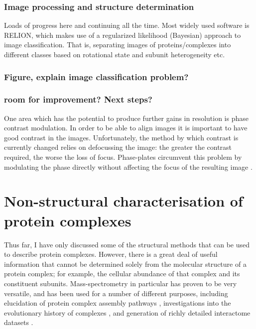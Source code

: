 \documentclass[a4paper,11pt,twoside,openright]{scrbook}
\let\cite\supercite
\begin{document}
\subsubsection{Image processing and structure determination}
Loads of progress here and continuing all the time. Most widely used software is RELION, which makes use of a regularized likelihood (Bayesian) approach to image classification. That is, separating images of proteins/complexes into different classes based on rotational state and subunit heterogeneity etc.

\subsubsection{Figure, explain image classification problem?}

\subsubsection{room for improvement? Next steps?}
One area which has the potential to produce further gains in resolution is phase contrast modulation. In order to be able to align images it is important to have good contrast in the images. Unfortunately, the method by which contrast is currently changed relies on defocussing the image: the greater the contrast required, the worse the loss of focus. Phase-plates circumvent this problem by modulating the phase directly without affecting the focus of the resulting image \cite{Danev2016}.

\section{Non-structural characterisation of protein complexes}
Thus far, I have only discussed some of the structural methods that can be used to describe protein complexes. However, there is a great deal of useful information that cannot be determined solely from the molecular structure of a protein complex; for example, the cellular abundance of that complex and its constituent subunits. Mass-spectrometry in particular has proven to be very versatile, and has been used for a number of different purposes, including elucidation of protein complex assembly pathways \cite{Levy2008a,Marsh2013}, investigations into the evolutionary history of complexes \cite{Wan2015}, and generation of richly detailed interactome datasets \cite{Hein2015}.
\end{document}
